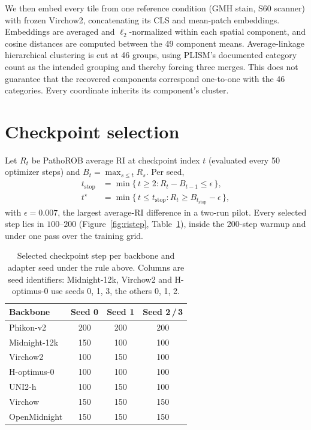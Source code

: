 We then embed every tile from one reference condition (GMH stain, S60 scanner) with frozen
Virchow2, concatenating its CLS and mean-patch embeddings. Embeddings are averaged and
$\ell_2$-normalized within each spatial component, and cosine distances are computed between
the 49 component means. Average-linkage hierarchical clustering is cut at 46 groups, using
PLISM's documented category count as the intended grouping and thereby forcing three
merges. This does not guarantee that the recovered components correspond one-to-one
with the 46 categories. Every coordinate inherits its component's cluster.

\section{Checkpoint selection}
\label{app:selection}

Let $R_t$ be PathoROB average RI at checkpoint index $t$ (evaluated every 50 optimizer steps) and $B_t=\max_{s\le t}R_s$. Per seed,
\begin{align}
t_{\mathrm{stop}} &= \min\{\,t\ge 2 : R_t-B_{t-1}\le\epsilon\,\}, \\
t^\star &= \min\{\,t\le t_{\mathrm{stop}} : R_t\ge B_{t_{\mathrm{stop}}}-\epsilon\,\},
\end{align}
with $\epsilon=0.007$, the largest average-RI difference in a two-run pilot. Every selected step
lies in $100$--$200$ (Figure~\ref{fig:ristep}, Table~\ref{tab:selected}), inside the 200-step
warmup and under one pass over the training grid.

\begin{table}[htbp]
\caption{Selected checkpoint step per backbone and adapter seed under the rule above.
Columns are seed identifiers: Midnight-12k, Virchow2 and H-optimus-0 use seeds 0, 1, 3, the
others 0, 1, 2.}
\label{tab:selected}
\centering
\begin{tabular}{lccc}
\toprule
Backbone & Seed 0 & Seed 1 & Seed 2\,/\,3 \\
\midrule
Phikon-v2 & 200 & 200 & 200 \\
Midnight-12k & 150 & 100 & 100 \\
Virchow2 & 100 & 150 & 100 \\
H-optimus-0 & 100 & 100 & 100 \\
UNI2-h & 100 & 150 & 100 \\
Virchow & 150 & 150 & 150 \\
OpenMidnight & 150 & 150 & 150 \\
\bottomrule
\end{tabular}
\end{table}

